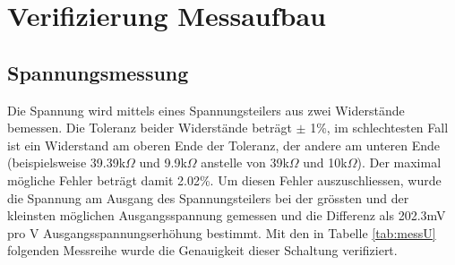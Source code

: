 \section{Verifizierung Messaufbau}

\subsection{Spannungsmessung}\label{subsec_messu}
Die Spannung wird mittels eines Spannungsteilers aus zwei Widerstände bemessen. Die Toleranz beider Widerstände beträgt $\pm$ 1\%, im schlechtesten Fall ist ein Widerstand am oberen Ende der Toleranz, der andere am unteren Ende (beispielsweise 39.39k$\Omega$ und 9.9k$\Omega$ anstelle von 39k$\Omega$ und 10k$\Omega$). Der maximal mögliche Fehler beträgt damit 2.02\%. \newline
Um diesen Fehler auszuschliessen, wurde die Spannung am Ausgang des Spannungsteilers bei der grössten und der kleinsten möglichen Ausgangsspannung gemessen und die Differenz als 202.3mV pro V Ausgangsspannungserhöhung bestimmt. Mit den in Tabelle \ref{tab:messU} folgenden Messreihe wurde die Genauigkeit dieser Schaltung verifiziert.
